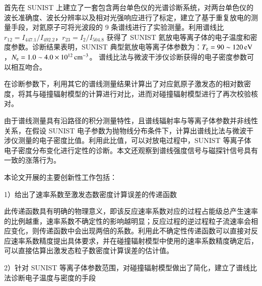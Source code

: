 首先在 SUNIST 上建立了一套包含两台单色仪的光谱诊断系统，对两台单色仪的波长准确度、波长分辨率以及相对光强响应进行了标定，建立了基于重复放电的测量手段，对氦原子可将光波段的 9 条谱线进行了实验测量。利用谱线比 $r_{12}=I_{447.1}/I_{492.2}$，$r_{23}=I_{2}/I_{504.8}$ 获得了 SUNIST 氦放电等离子体的电子温度和密度参数。诊断结果表明，SUNIST 典型氦放电等离子体参数为：$T_{\rm e}=90\sim120\,{\rm eV}$，$N_{\rm e}=1.0\sim4.0\times 10^{12}\,{\rm cm}^{-3}$。 谱线比法与微波干涉仪诊断获得的电子密度参数可以相互吻合。

在诊断参数下，利用其它的谱线测量结果计算出了对应氦原子激发态的相对数密度，将其与碰撞辐射模型的计算进行对比，进而对碰撞辐射模型进行了再次校验核对。

由于谱线测量具有沿路径的积分测量特性，且谱线辐射率与等离子体参数并非线性关系，在假设 SUNIST 电子参数为抛物线分布条件下，计算出谱线比法与微波干涉仪测量的电子密度比值。利用此比值，可以对放电过程中，SUNIST 等离子体电子密度分布变化进行定性的诊断。本文还观察到谱线强度信号与磁探针信号具有一致的涨落行为。

本论文开展的主要创新性工作包括：

1）给出了速率系数至激发态数密度计算误差的传递函数

此传递函数具有明确的物理意义，即该反应速率系数对应的过程占能级总产生速率的比例越重，速率系数不确定性的影响越明显；反应过程的逆过程粒子流速率会相应变化，则传递函数中会出现两倍的系数。利用此不确定性传递函数可以直接对反应速率系数精度提出具体要求，并在碰撞辐射模型中使用的速率系数精度确定后，可以直接估算出激发态粒子数密度计算误差的估计值。

2）针对 SUNIST 等离子体参数范围，对碰撞辐射模型做出了简化，建立了谱线比法诊断电子温度与密度的手段%

